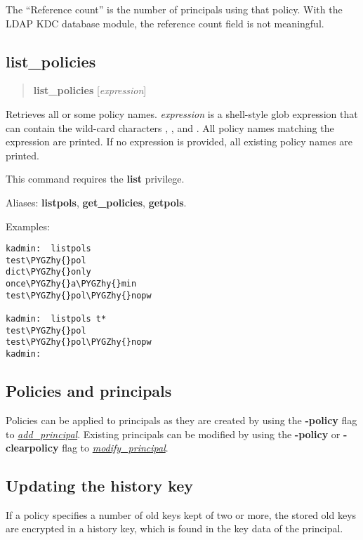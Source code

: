 \documentclass[letterpaper,10pt,english]{sphinxmanual}
\def\PYGZhy{\char`\-}
\begin{document}
The ``Reference count'' is the number of principals using that policy.
With the LDAP KDC database module, the reference count field is not
meaningful.


\subsection{list\_policies}
\label{admin/database:list-policies}\begin{quote}

\textbf{list\_policies} {[}\emph{expression}{]}
\end{quote}

Retrieves all or some policy names.  \emph{expression} is a shell-style
glob expression that can contain the wild-card characters ,
\code{*}, and \code{{[}{]}}.  All policy names matching the expression are
printed.  If no expression is provided, all existing policy names are
printed.

This command requires the \textbf{list} privilege.

Aliases: \textbf{listpols}, \textbf{get\_policies}, \textbf{getpols}.

Examples:

\begin{Verbatim}[commandchars=\\\{\}]
kadmin:  listpols
test\PYGZhy{}pol
dict\PYGZhy{}only
once\PYGZhy{}a\PYGZhy{}min
test\PYGZhy{}pol\PYGZhy{}nopw

kadmin:  listpols t*
test\PYGZhy{}pol
test\PYGZhy{}pol\PYGZhy{}nopw
kadmin:
\end{Verbatim}


\subsection{Policies and principals}
\label{admin/database:policies-and-principals}
Policies can be applied to principals as they are created by using
the \textbf{-policy} flag to {\hyperref[admin/admin_commands/kadmin_local:add-principal]{\emph{add\_principal}}}. Existing principals can
be modified by using the \textbf{-policy} or \textbf{-clearpolicy} flag to
{\hyperref[admin/admin_commands/kadmin_local:modify-principal]{\emph{modify\_principal}}}.


\subsection{Updating the history key}
\label{admin/database:updating-the-history-key}
If a policy specifies a number of old keys kept of two or more, the
stored old keys are encrypted in a history key, which is found in the
key data of the  principal.
\end{document}
